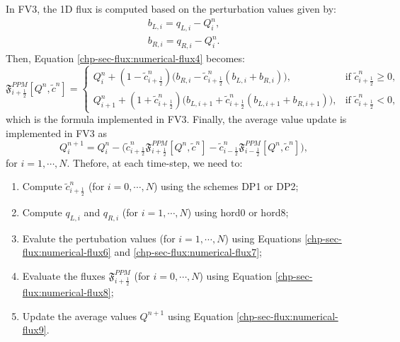 In FV3, the 1D flux is computed based on the perturbation values \citep{harris:2021} given by:
\begin{align}
\label{chp-sec-flux:numerical-flux6}
b_{L,i} = q_{L,i} - Q_i^n, \\
\label{chp-sec-flux:numerical-flux7}
b_{R,i} = q_{R,i} - Q_i^n.
\end{align}
Then, Equation \eqref{chp-sec-flux:numerical-flux4} becomes:
\begin{equation}
	\label{chp-sec-flux:numerical-flux8}
        \mathfrak{F}_{i+\frac{1}{2}}^{PPM}[Q^n,\tilde{c}^n]  =  
    	\begin{cases}
        Q_{i}^n +
        (1-\tilde{c}_{{i+\frac{1}{2}}}^n)
        \big(b_{R,i}-\tilde{c}_{{i+\frac{1}{2}}}^n
        (b_{L,i}+b_{R,i})\big),
	& \text{if } \tilde{c}_{i+\frac{1}{2}}^n \geq 0,\\
	Q_{i+1}^n +
        (1+\tilde{c}_{{i+\frac{1}{2}}}^n)
        \big(b_{L,i+1}+\tilde{c}_{{i+\frac{1}{2}}}^n
        (b_{L,i+1}+b_{R,i+1})\big),
	& \text{if } \tilde{c}_{i+\frac{1}{2}}^n<0,
    	\end{cases}
\end{equation}
which is the formula implemented in FV3.
Finally, the average value update is implemented in FV3 as
\begin{equation}
	\label{chp-sec-flux:numerical-flux9}
	Q_i^{n+1} = Q_i^{n} - 
        \big(\tilde{c}_{i+\frac{1}{2}}^n\mathfrak{F}_{i+\frac{1}{2}}^{PPM}[Q^n,\tilde{c}^n] -
        \tilde{c}_{i-\frac{1}{2}}^n\mathfrak{F}_{i-\frac{1}{2}}^{PPM}[Q^n,\tilde{c}^n]  \big),
\end{equation}
for $i=1, \cdots, N$.
Thefore, at each time-step, we need to:
\begin{enumerate}
\item Compute $\tilde{c}_{i+\frac{1}{2}}^n$ (for $i = 0, \cdots, N$) using the schemes DP1 or DP2;
\item Compute $q_{L,i}$ and  $q_{R,i}$ (for $i = 1, \cdots, N$) using hord0 or hord8;
\item Evalute the pertubation values (for $i = 1, \cdots, N$) using Equations
\eqref{chp-sec-flux:numerical-flux6} and \eqref{chp-sec-flux:numerical-flux7};
\item Evaluate the fluxes  $\mathfrak{F}_{i+\frac{1}{2}}^{PPM}$ (for $i = 0, \cdots, N$) using Equation \eqref{chp-sec-flux:numerical-flux8};
\item Update the average values $Q^{n+1}$ using Equation \eqref{chp-sec-flux:numerical-flux9}.
\end{enumerate}
